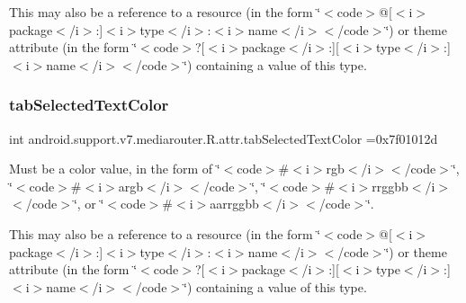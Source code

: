 This may also be a reference to a resource (in the form \char`\"{}$<$code$>$@\mbox{[}$<$i$>$package$<$/i$>$\+:\mbox{]}$<$i$>$type$<$/i$>$\+:$<$i$>$name$<$/i$>$$<$/code$>$\char`\"{}) or theme attribute (in the form \char`\"{}$<$code$>$?\mbox{[}$<$i$>$package$<$/i$>$\+:\mbox{]}\mbox{[}$<$i$>$type$<$/i$>$\+:\mbox{]}$<$i$>$name$<$/i$>$$<$/code$>$\char`\"{}) containing a value of this type. \mbox{\label{classandroid_1_1support_1_1v7_1_1mediarouter_1_1R_1_1attr_a72d9cff66ac0341f5746840927dcd013}} 
\subsubsection{\texorpdfstring{tab\+Selected\+Text\+Color}{tabSelectedTextColor}}
{\footnotesize\ttfamily int android.\+support.\+v7.\+mediarouter.\+R.\+attr.\+tab\+Selected\+Text\+Color =0x7f01012d\hspace{0.3cm}{\ttfamily [static]}}

Must be a color value, in the form of \char`\"{}$<$code$>$\#$<$i$>$rgb$<$/i$>$$<$/code$>$\char`\"{}, \char`\"{}$<$code$>$\#$<$i$>$argb$<$/i$>$$<$/code$>$\char`\"{}, \char`\"{}$<$code$>$\#$<$i$>$rrggbb$<$/i$>$$<$/code$>$\char`\"{}, or \char`\"{}$<$code$>$\#$<$i$>$aarrggbb$<$/i$>$$<$/code$>$\char`\"{}. 

This may also be a reference to a resource (in the form \char`\"{}$<$code$>$@\mbox{[}$<$i$>$package$<$/i$>$\+:\mbox{]}$<$i$>$type$<$/i$>$\+:$<$i$>$name$<$/i$>$$<$/code$>$\char`\"{}) or theme attribute (in the form \char`\"{}$<$code$>$?\mbox{[}$<$i$>$package$<$/i$>$\+:\mbox{]}\mbox{[}$<$i$>$type$<$/i$>$\+:\mbox{]}$<$i$>$name$<$/i$>$$<$/code$>$\char`\"{}) containing a value of this type. \mbox{\label{classandroid_1_1support_1_1v7_1_1mediarouter_1_1R_1_1attr_ab402c331d81c2362a8853eb204ebc309}} 
